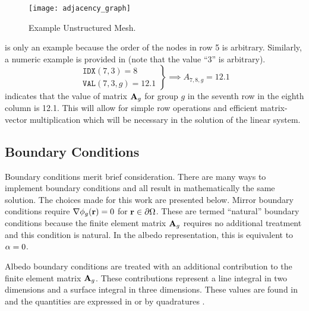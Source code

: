     \begin{figure}
      \centering
      \texttt{[image: adjacency\_graph]}
      \caption{Example Unstructured Mesh.}
      \label{fig:adjacency_graph}
    \end{figure}

     is only an example because the order of the nodes in 
    row 5 is arbitrary. Similarly, a numeric example is provided in 
     (note that the value ``3'' is arbitrary).
    \begin{equation}
      \label{eq:idx_number}
      \left.
      \begin{array}{c}
        \texttt{IDX}(7,3) = 8 \\
        \texttt{VAL}(7,3,g) = 12.1
      \end{array}
      \right\}
      \implies
      A_{7,8,g} = 12.1
    \end{equation}
     indicates that the value of matrix $\mathbf{A}_g$ for group
    $g$ in the seventh row in the eighth column is 12.1. This will allow for 
    simple row operations and efficient matrix-vector multiplication which will
    be necessary in the solution of the linear system.

  \subsection{Boundary Conditions}
    \label{sec:boundary_conditions}
    Boundary conditions merit brief consideration. There are many ways to 
    implement boundary conditions and all result in mathematically the same 
    solution. The choices made for this work are presented below. Mirror 
    boundary conditions require $\mathbf{\nabla} \phi_g(\mathbf{r}) = 0$ for 
    $\mathbf{r} \in \partial \Omega$. These are termed ``natural'' boundary
    conditions because the finite element matrix $\mathbf{A}_g$ requires no additional 
    treatment and this condition is natural. In the albedo representation, this
    is equivalent to $\alpha = 0$.
    
    Albedo boundary conditions are treated with an additional contribution to 
    the finite element matrix $\mathbf{A}_g$. These contributions represent a line 
    integral in two dimensions and a surface integral in three dimensions. These
    values are found in  and the quantities are 
    expressed in  or by quadratures 
    .
    
